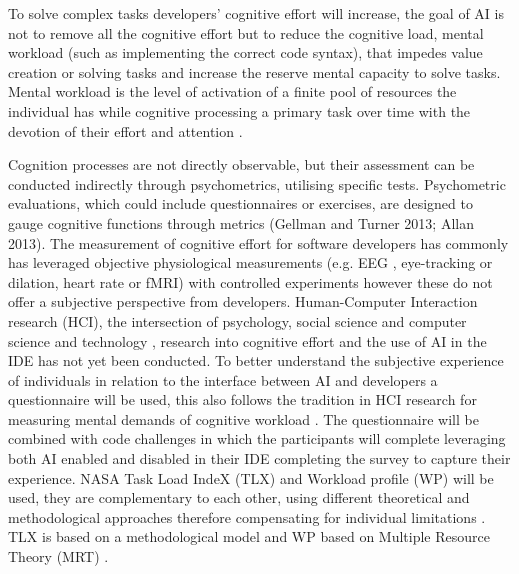 \documentclass[man]{apa7}
\begin{document}
To solve complex tasks developers' cognitive effort will increase, the goal of AI is not to remove all the cognitive effort but to reduce the cognitive load, mental workload (such as implementing the correct code syntax), that impedes value creation or solving tasks and increase the reserve mental capacity to solve tasks. Mental workload is the level of activation of a finite pool of resources the individual has while cognitive processing a primary task over time with the devotion of their effort and attention \parencite{Longo2022HumanDefinition}.

Cognition processes are not directly observable, but their assessment can be conducted indirectly through psychometrics, utilising specific tests. Psychometric evaluations, which could include questionnaires or exercises, are designed to gauge cognitive functions through metrics \parencite{} (Gellman and Turner 2013; Allan 2013). The measurement of cognitive effort for software developers has commonly has leveraged objective physiological measurements (e.g. EEG \parencite{Jatupaiboon2013EmotionBands, Minas2017NeurophysiologicalDevelopers}, eye-tracking \parencite{Fritz2014UsingDevelopment} or dilation, heart rate or fMRI) with controlled experiments \parencite{Goncales2019MeasuringStudy} however these do not offer a subjective perspective from developers. Human-Computer Interaction research (HCI), the intersection of psychology, social science and computer science and technology \parencite{Carroll1997Human-computerDesign}, research into cognitive effort and the use of AI in the IDE has not yet been conducted. To better understand the subjective experience of individuals in relation to the interface between AI and developers a questionnaire will be used, this also follows the tradition in HCI research for measuring mental demands of  cognitive workload \parencite{Kosch2023AInteraction}. The questionnaire will be combined with code challenges in which the participants will complete leveraging both AI enabled and disabled in their IDE completing the survey to capture their experience. NASA Task Load IndeX (TLX) and Workload profile (WP) will be used, they are complementary to each other, using different theoretical and methodological approaches therefore compensating for individual limitations \parencite{Rubio2004EvaluationMethods, Paxion2014Complexite}. TLX is based on a methodological model and WP based on Multiple Resource Theory (MRT) \parencite{Wickens1984ProcessingAttention, Wickens2008MultipleWorkload, Wickens2020ProcessingAttention}.
\end{document}
